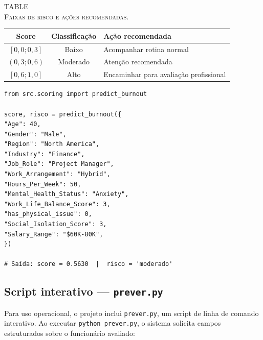 \documentclass[conference]{IEEEtran}
\begin{document}
\noindent\begin{minipage}{\columnwidth}
\centering
{}\label{tab:risk}
{\footnotesize\textsc{TABLE~\thetable}\\[-1pt]
\textsc{Faixas de risco e ações recomendadas.}\par}
\vspace{3pt}
\small
\setlength{\tabcolsep}{3pt}
\begin{tabular}{ccp{}}
\toprule
\textbf{Score}    & \textbf{Classificação} & \textbf{Ação recomendada} \\
\midrule
$[0{,}0; 0{,}3]$ & Baixo                  & Acompanhar rotina normal  \\
$(0{,}3; 0{,}6)$ & Moderado               & Atenção recomendada       \\
$[0{,}6; 1{,}0]$ & Alto                   & Encaminhar para avaliação profissional \\
\bottomrule
\end{tabular}
\par\vspace{1pt}{\footnotesize Fonte: elaborado pelos autores.\par}
\end{minipage}

\begin{lstlisting}[caption={Uso programático de \texttt{predict_burnout}
via \texttt{src/scoring.py}.}]
from src.scoring import predict_burnout

score, risco = predict_burnout({
"Age": 40,
"Gender": "Male",
"Region": "North America",
"Industry": "Finance",
"Job_Role": "Project Manager",
"Work_Arrangement": "Hybrid",
"Hours_Per_Week": 50,
"Mental_Health_Status": "Anxiety",
"Work_Life_Balance_Score": 3,
"has_physical_issue": 0,
"Social_Isolation_Score": 3,
"Salary_Range": "$60K-80K",
})

# Saída: score = 0.5630  |  risco = 'moderado'

\end{lstlisting}

\subsection{Script interativo — \texttt{prever.py}}

Para uso operacional, o projeto inclui \texttt{prever.py}, um script de
linha de comando interativo. Ao executar \texttt{python prever.py}, o
sistema solicita campos estruturados sobre o funcionário avaliado:
\end{document}
